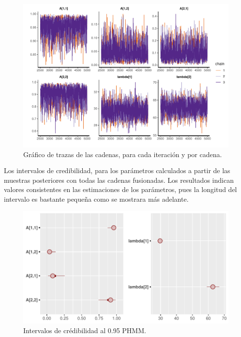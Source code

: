 \documentclass[a4paper]{article}\usepackage[]{graphicx}\usepackage[]{color}
\makeatletter
\def\maxwidth{ %
  \ifdim\Gin@nat@width>\linewidth
    \linewidth
  \else
    \Gin@nat@width
  \fi
}
\newenvironment{knitrout}{}{} %
\makeatother
\begin{document}
\begin{knitrout}
\color{fgcolor}\begin{figure}[h]
\includegraphics[width=\maxwidth]{figure/unnamed-chunk-30-1} \caption[Gráfico de trazas de las cadenas, para cada iteración y por cadena]{Gráfico de trazas de las cadenas, para cada iteración y por cadena.}\label{fig:unnamed-chunk-30}
\end{figure}


\end{knitrout}
                              
Los intervalos de credibilidad, para los parámetros calculados a partir de las muestras posteriores con todas las cadenas fusionadas. Los resultados indican valores consistentes en las estimaciones de los parámetros, pues la longitud del intervalo es bastante pequeña como se mostrara más adelante.

\begin{knitrout}
\color{fgcolor}\begin{figure}
\includegraphics[width=\maxwidth]{figure/unnamed-chunk-31-1} \caption[Intervalos de crédibilidad al 0.95 PHMM]{Intervalos de crédibilidad al 0.95 PHMM.}\label{fig:unnamed-chunk-31}
\end{figure}


\end{knitrout}
\end{document}
